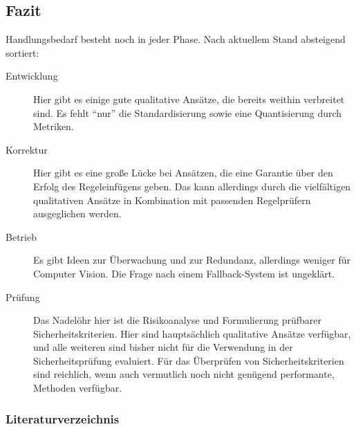 \subsection{Fazit}
Handlungsbedarf besteht noch in jeder Phase.
Nach aktuellem Stand absteigend sortiert:
\begin{description}
\item[Entwicklung] Hier gibt es einige gute qualitative Ansätze, die
  bereits weithin verbreitet sind. Es fehlt \enquote{nur} die
  Standardisierung sowie eine Quantisierung durch Metriken.
\item[Korrektur] Hier gibt es eine große Lücke bei Ansätzen, die eine
  Garantie über den Erfolg des Regeleinfügens geben. Das kann
  allerdings durch die vielfältigen qualitativen Ansätze in
  Kombination mit passenden Regelprüfern ausgeglichen werden.
\item[Betrieb] Es gibt Ideen zur Überwachung und zur Redundanz,
  allerdings weniger für Computer Vision.
  Die Frage nach einem Fallback-System ist ungeklärt.
\item[Prüfung] Das Nadelöhr hier ist die Risikoanalyse und
  Formulierung prüfbarer Sicherheitskriterien.
  Hier sind hauptsächlich qualitative Ansätze verfügbar,
  und alle weiteren sind bisher nicht für die Verwendung in der
  Sicherheitsprüfung evaluiert.
  Für das Überprüfen von Sicherheitskriterien sind reichlich, wenn
  auch vermutlich noch nicht genügend performante, Methoden
  verfügbar.
\end{description}



\begin{frame}[t,allowframebreaks]
  \frametitle<presentation>{Literaturverzeichnis}
  \tiny
  \printbibliography
\end{frame}







